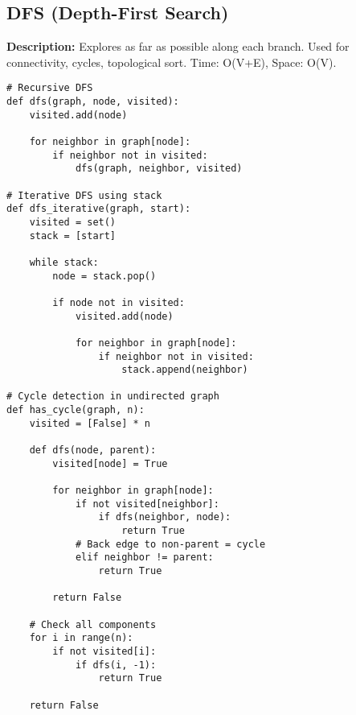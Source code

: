 \subsection{DFS (Depth-First Search)}
\textbf{Description:} Explores as far as possible along each branch. Used for connectivity, cycles, topological sort. Time: O(V+E), Space: O(V).

\begin{lstlisting}
# Recursive DFS
def dfs(graph, node, visited):
    visited.add(node)
    
    for neighbor in graph[node]:
        if neighbor not in visited:
            dfs(graph, neighbor, visited)

# Iterative DFS using stack
def dfs_iterative(graph, start):
    visited = set()
    stack = [start]
    
    while stack:
        node = stack.pop()
        
        if node not in visited:
            visited.add(node)
            
            for neighbor in graph[node]:
                if neighbor not in visited:
                    stack.append(neighbor)

# Cycle detection in undirected graph
def has_cycle(graph, n):
    visited = [False] * n
    
    def dfs(node, parent):
        visited[node] = True
        
        for neighbor in graph[node]:
            if not visited[neighbor]:
                if dfs(neighbor, node):
                    return True
            # Back edge to non-parent = cycle
            elif neighbor != parent:
                return True
        
        return False
    
    # Check all components
    for i in range(n):
        if not visited[i]:
            if dfs(i, -1):
                return True
    
    return False
\end{lstlisting}
